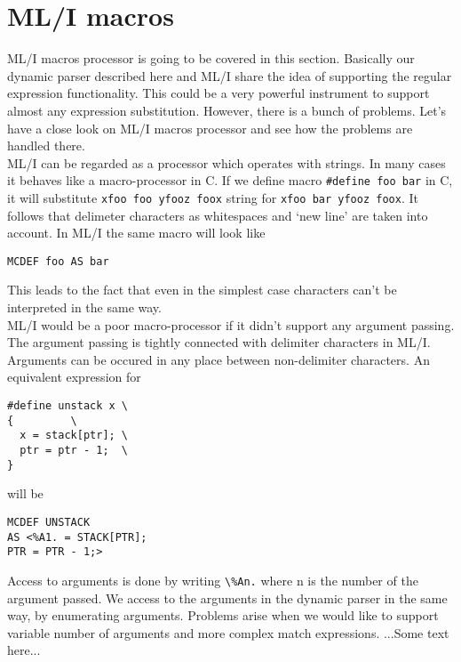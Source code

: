 \section{ML/I macros}
ML/I macros processor\cite{mli} is going to be covered in this section. 
Basically our 
dynamic parser described here and ML/I share the idea of supporting the 
regular expression functionality. This could be a very powerful
instrument to support almost any expression substitution. However, there is a
bunch of problems. Let's have a close look on ML/I macros processor and see how
the problems are handled there. \\
ML/I can be regarded as a processor which operates with strings. In many cases
it behaves like a macro-processor in C. If we define macro 
\verb|#define foo bar| in C, it will substitute \verb|xfoo foo yfooz foox| 
string for \verb|xfoo bar yfooz foox|. It follows that delimeter characters as
whitespaces and `new line' are
taken into account. In ML/I the same macro will look like
\begin{verbatim}
MCDEF foo AS bar
\end{verbatim}
This leads to the fact that even in the simplest case characters can't be
interpreted in the same way. \\
ML/I would be a poor macro-processor if it didn't support any argument passing.
The argument passing is tightly connected with delimiter characters in ML/I.
Arguments can be occured in any place between non-delimiter characters. An
equivalent expression for
\begin{verbatim}
#define unstack x \
{		  \
  x = stack[ptr]; \
  ptr = ptr - 1;  \
}
\end{verbatim}
will be\cite{mli-guide}
\begin{verbatim}
MCDEF UNSTACK
AS <%A1. = STACK[PTR];
PTR = PTR - 1;>
\end{verbatim}
Access to arguments is done by writing \verb|\%An.| where n is the number of the
argument passed. We access to the arguments in the dynamic parser in the same
way, by enumerating arguments. Problems arise when we would like to support
variable number of arguments and more complex match expressions.
...Some text here...
